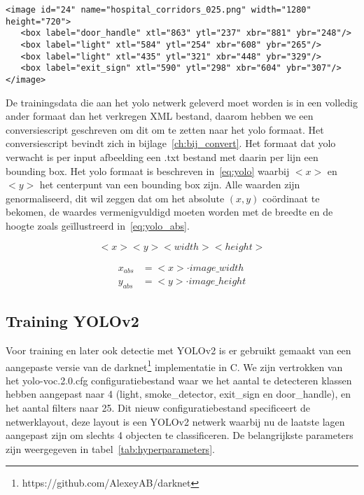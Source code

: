   \begin{lstlisting}[basicstyle=\small]
<image id="24" name="hospital_corridors_025.png" width="1280" height="720">
   <box label="door_handle" xtl="863" ytl="237" xbr="881" ybr="248"/>
   <box label="light" xtl="584" ytl="254" xbr="608" ybr="265"/>
   <box label="light" xtl="435" ytl="321" xbr="448" ybr="329"/>
   <box label="exit_sign" xtl="590" ytl="298" xbr="604" ybr="307"/>
</image>
   \end{lstlisting}

De trainingsdata die aan het \gls{yolo} netwerk geleverd moet worden is in een volledig ander formaat dan het verkregen XML bestand, daarom hebben we een conversiescript geschreven om dit om te zetten naar het \gls{yolo} formaat.
Het conversiescript bevindt zich in bijlage~\ref{ch:bij_convert}.
Het formaat dat \gls{yolo} verwacht is per input afbeelding een .txt bestand met daarin per lijn een bounding box. Het \gls{yolo} formaat is beschreven in~\ref{eq:yolo} waarbij $<x>$ en $<y>$ het centerpunt van een bounding box zijn.
Alle waarden zijn genormaliseerd, dit wil zeggen dat om het absolute $(x, y)$ co\"{o}rdinaat te bekomen, de waardes vermenigvuldigd moeten worden met de breedte en de hoogte zoals ge\"{i}llustreerd in~\ref{eq:yolo_abs}.

\begin{equation} \label{eq:yolo}
  <x> <y> <width> <height>
\end{equation}

\begin{equation} \label{eq:yolo_abs}
    \begin{split}
        x_{abs} &= <x> \cdot  image\_width \\
        y_{abs} &= <y> \cdot image\_height
    \end{split}
\end{equation}


\subsection{Training YOLOv2}

Voor training en later ook detectie met YOLOv2 is er gebruikt gemaakt van een aangepaste versie van de darknet\footnote{https://github.com/AlexeyAB/darknet} implementatie in C.
We zijn vertrokken van het yolo-voc.2.0.cfg configuratiebestand waar we het aantal te detecteren klassen hebben aangepast naar 4 (light, smoke\_detector, exit\_sign en door\_handle), en het aantal filters naar 25.
Dit nieuw configuratiebestand specificeert de netwerklayout, deze layout is een YOLOv2 netwerk waarbij nu de laatste lagen aangepast zijn om slechts 4 objecten te classificeren.
De belangrijkste parameters zijn weergegeven in tabel~\ref{tab:hyperparameters}.

